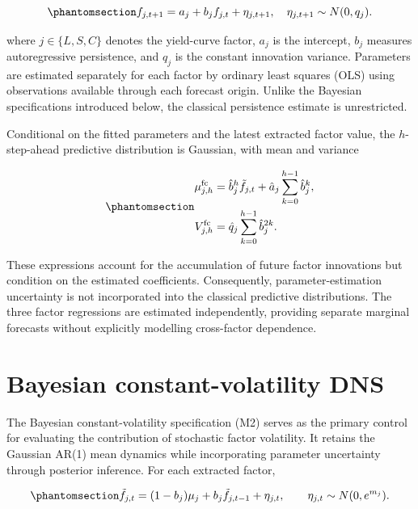 \documentclass[
  12pt,
  letterpaper,
  DIV=11,
  numbers=noendperiod]{scrreprt}
\begin{document}
\begin{equation}\protect\phantomsection\label{eq-ar}{
f_{j,t+1}=a_j+b_j f_{j,t}+\eta_{j,t+1},
\quad \eta_{j,t+1}\sim N(0,q_j).
}\end{equation}

where \(j\in\{L,S,C\}\) denotes the yield-curve factor, \(a_j\) is the
intercept, \(b_j\) measures autoregressive persistence, and \(q_j\) is
the constant innovation variance. Parameters are estimated separately
for each factor by ordinary least squares (OLS) using observations
available through each forecast origin. Unlike the Bayesian
specifications introduced below, the classical persistence estimate is
unrestricted.

Conditional on the fitted parameters and the latest extracted factor
value, the \(h\)-step-ahead predictive distribution is Gaussian, with
mean and variance

\begin{equation}\protect\phantomsection\label{eq-ar-moments}{
\begin{aligned}
\mu^{\mathrm{fc}}_{j,h}
&=\hat b_j^h\tilde f_{j,t}
+\hat a_j\sum_{k=0}^{h-1}\hat b_j^k,\\
V^{\mathrm{fc}}_{j,h}
&=\hat q_j\sum_{k=0}^{h-1}\hat b_j^{2k}.
\end{aligned}
}\end{equation}

These expressions account for the accumulation of future factor
innovations but condition on the estimated coefficients. Consequently,
parameter-estimation uncertainty is not incorporated into the classical
predictive distributions. The three factor regressions are estimated
independently, providing separate marginal forecasts without explicitly
modelling cross-factor dependence.

\section{Bayesian constant-volatility
DNS}\label{bayesian-constant-volatility-dns}

The Bayesian constant-volatility specification (M2) serves as the
primary control for evaluating the contribution of stochastic factor
volatility. It retains the Gaussian AR(1) mean dynamics while
incorporating parameter uncertainty through posterior inference. For
each extracted factor,

\begin{equation}\protect\phantomsection\label{eq-m3-factor}{
\tilde f_{j,t}=(1-b_j)\mu_j+b_j\tilde f_{j,t-1}+\eta_{j,t},
\qquad \eta_{j,t}\sim N(0,e^{m_j}).
}\end{equation}
\end{document}
